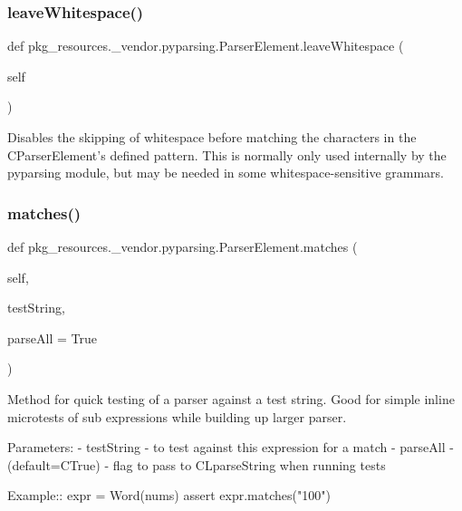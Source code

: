 \subsubsection{\texorpdfstring{leave\+Whitespace()}{leaveWhitespace()}}
{\footnotesize\ttfamily def pkg\+\_\+resources.\+\_\+vendor.\+pyparsing.\+Parser\+Element.\+leave\+Whitespace (\begin{DoxyParamCaption}\item[{}]{self }\end{DoxyParamCaption})}

\begin{DoxyVerb}Disables the skipping of whitespace before matching the characters in the
C{ParserElement}'s defined pattern.  This is normally only used internally by
the pyparsing module, but may be needed in some whitespace-sensitive grammars.
\end{DoxyVerb}
 \mbox{\label{classpkg__resources_1_1__vendor_1_1pyparsing_1_1_parser_element_ac13ecd02ff2ecec127dcc7e1cc94311c}} 
\subsubsection{\texorpdfstring{matches()}{matches()}}
{\footnotesize\ttfamily def pkg\+\_\+resources.\+\_\+vendor.\+pyparsing.\+Parser\+Element.\+matches (\begin{DoxyParamCaption}\item[{}]{self,  }\item[{}]{test\+String,  }\item[{}]{parse\+All = {\ttfamily True} }\end{DoxyParamCaption})}

\begin{DoxyVerb}Method for quick testing of a parser against a test string. Good for simple 
inline microtests of sub expressions while building up larger parser.
   
Parameters:
 - testString - to test against this expression for a match
 - parseAll - (default=C{True}) - flag to pass to C{L{parseString}} when running tests
    
Example::
    expr = Word(nums)
    assert expr.matches("100")
\end{DoxyVerb}
 \mbox{\label{classpkg__resources_1_1__vendor_1_1pyparsing_1_1_parser_element_a58920492aecac3860b5013ea35bdca1d}} 
